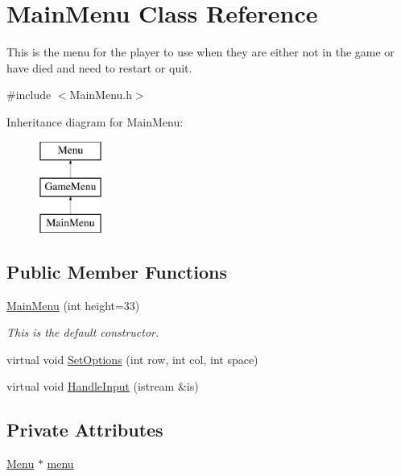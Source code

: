 \hypertarget{classMainMenu}{\section{Main\-Menu Class Reference}
\label{classMainMenu}
}


This is the menu for the player to use when they are either not in the game or have died and need to restart or quit.  




{\ttfamily \#include $<$Main\-Menu.\-h$>$}

Inheritance diagram for Main\-Menu\-:\begin{figure}[H]
\begin{center}
\leavevmode
\includegraphics[height=3.000000cm]{classMainMenu}
\end{center}
\end{figure}
\subsection*{Public Member Functions}
\begin{DoxyCompactItemize}
\item 
\hyperlink{classMainMenu_aa626a8f5895b449a1d23f5be235210aa}{Main\-Menu} (int height=33)
\begin{DoxyCompactList}\small\item\em This is the default constructor. \end{DoxyCompactList}\item 
virtual void \hyperlink{classMainMenu_a44ab04810a68d7ddf3843464573b7967}{Set\-Options} (int row, int col, int space)
\item 
virtual void \hyperlink{classMainMenu_a85703c73c1bcc9be2144b1cbe413328e}{Handle\-Input} (istream \&is)
\end{DoxyCompactItemize}
\subsection*{Private Attributes}
\begin{DoxyCompactItemize}
\item 
\hyperlink{classMenu}{Menu} $\ast$ \hyperlink{classMainMenu_ae7d51673d2212c49550307dff79f6aba}{menu}
\end{DoxyCompactItemize}
